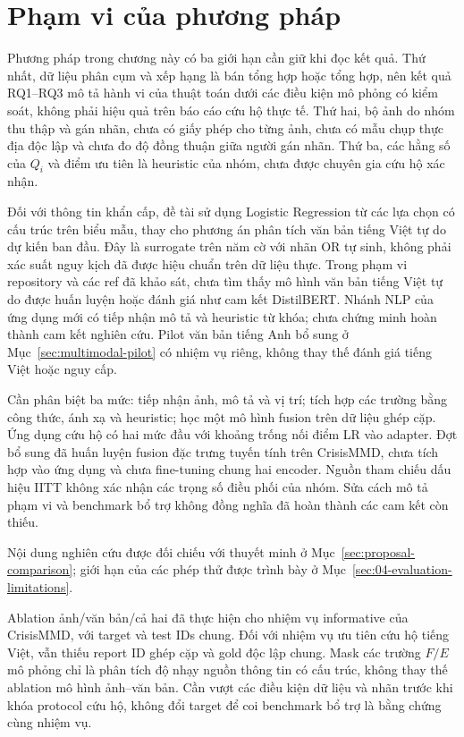 \section{Phạm vi của phương pháp}\label{sec:02-scope}
Phương pháp trong chương này có ba giới hạn cần giữ khi đọc kết quả. Thứ nhất, dữ liệu phân cụm và xếp hạng là bán tổng hợp hoặc tổng hợp, nên kết quả RQ1--RQ3 mô tả hành vi của thuật toán dưới các điều kiện mô phỏng có kiểm soát, không phải hiệu quả trên báo cáo cứu hộ thực tế. Thứ hai, bộ ảnh do nhóm thu thập và gán nhãn, chưa có giấy phép cho từng ảnh, chưa có mẫu chụp thực địa độc lập và chưa đo độ đồng thuận giữa người gán nhãn. Thứ ba, các hằng số của $Q_i$ và điểm ưu tiên là heuristic của nhóm, chưa được chuyên gia cứu hộ xác nhận.

Đối với thông tin khẩn cấp, đề tài sử dụng Logistic Regression từ các lựa chọn có cấu trúc trên biểu mẫu, thay cho phương án phân tích văn bản tiếng Việt tự do dự kiến ban đầu. Đây là surrogate trên năm cờ với nhãn OR tự sinh, không phải xác suất nguy kịch đã được hiệu chuẩn trên dữ liệu thực. Trong phạm vi repository và các ref đã khảo sát, chưa tìm thấy mô hình văn bản tiếng Việt tự do được huấn luyện hoặc đánh giá như cam kết DistilBERT. Nhánh NLP của ứng dụng mới có tiếp nhận mô tả và heuristic từ khóa; chưa chứng minh hoàn thành cam kết nghiên cứu. Pilot văn bản tiếng Anh bổ sung ở Mục~\ref{sec:multimodal-pilot} có nhiệm vụ riêng, không thay thế đánh giá tiếng Việt hoặc nguy cấp.

Cần phân biệt ba mức: tiếp nhận ảnh, mô tả và vị trí; tích hợp các trường bằng công thức, ánh xạ và heuristic; học một mô hình fusion trên dữ liệu ghép cặp. Ứng dụng cứu hộ có hai mức đầu với khoảng trống nối điểm LR vào adapter. Đợt bổ sung đã huấn luyện fusion đặc trưng tuyến tính trên CrisisMMD, chưa tích hợp vào ứng dụng và chưa fine-tuning chung hai encoder. Nguồn tham chiếu dấu hiệu IITT không xác nhận các trọng số điều phối của nhóm. Sửa cách mô tả phạm vi và benchmark bổ trợ không đồng nghĩa đã hoàn thành các cam kết còn thiếu.

Nội dung nghiên cứu được đối chiếu với thuyết minh ở Mục~\ref{sec:proposal-comparison}; giới hạn của các phép thử được trình bày ở Mục~\ref{sec:04-evaluation-limitations}.

Ablation ảnh/văn bản/cả hai đã thực hiện cho nhiệm vụ informative của CrisisMMD, với target và test IDs chung. Đối với nhiệm vụ ưu tiên cứu hộ tiếng Việt, vẫn thiếu report ID ghép cặp và gold độc lập chung. Mask các trường $F/E$ mô phỏng chỉ là phân tích độ nhạy nguồn thông tin có cấu trúc, không thay thế ablation mô hình ảnh--văn bản. Cần vượt các điều kiện dữ liệu và nhãn trước khi khóa protocol cứu hộ, không đổi target để coi benchmark bổ trợ là bằng chứng cùng nhiệm vụ.
